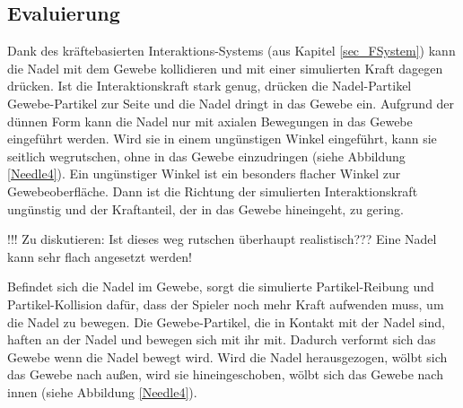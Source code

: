 


\subsection{Evaluierung}

Dank des  kräftebasierten Interaktions-Systems (aus Kapitel \ref{sec_FSystem}) kann die Nadel mit dem Gewebe kollidieren und mit einer simulierten Kraft dagegen drücken. 
Ist die Interaktionskraft stark genug, drücken die Nadel-Partikel Gewebe-Partikel zur Seite und die Nadel dringt in das Gewebe ein.
Aufgrund der dünnen Form kann die Nadel nur mit axialen Bewegungen in das Gewebe eingeführt werden. Wird sie in einem ungünstigen Winkel eingeführt, kann sie seitlich wegrutschen, ohne in das Gewebe einzudringen (siehe Abbildung \ref{Needle4}). Ein ungünstiger Winkel ist ein besonders flacher Winkel zur Gewebeoberfläche. Dann ist die Richtung der simulierten Interaktionskraft ungünstig und der Kraftanteil, der in das Gewebe hineingeht, zu gering.

!!! Zu diskutieren: Ist dieses weg rutschen überhaupt realistisch??? Eine Nadel kann sehr flach angesetzt werden!

Befindet sich die Nadel im Gewebe, sorgt die simulierte Partikel-Reibung und Partikel-Kollision dafür, dass der Spieler noch mehr Kraft aufwenden muss, um die Nadel zu bewegen. Die Gewebe-Partikel, die in Kontakt mit der Nadel sind, haften an der Nadel und bewegen sich mit ihr mit. Dadurch verformt sich das Gewebe wenn die Nadel bewegt wird. Wird die Nadel herausgezogen, wölbt sich das Gewebe nach außen, wird sie hineingeschoben, wölbt sich das Gewebe nach innen (siehe Abbildung \ref{Needle4}).


